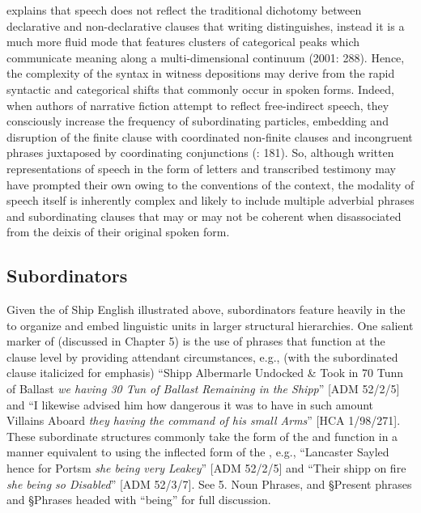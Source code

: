 \citeauthor{Givón2001} explains that speech does not reflect the traditional dichotomy between declarative and non-declarative clauses that writing distinguishes, instead it is a much more fluid mode that features clusters of categorical peaks which communicate meaning along a multi-dimensional continuum (2001: 288). Hence, the complexity of the syntax in witness depositions may derive from the rapid syntactic and categorical shifts that commonly occur in spoken forms. Indeed, when authors of narrative fiction attempt to reflect free-indirect speech, they consciously increase the frequency of subordinating particles, embedding and disruption of the finite clause with coordinated non-finite clauses and incongruent phrases juxtaposed by coordinating conjunctions (\citealt{Sotirova2016}: 181). So, although written representations of speech in the form of letters and transcribed testimony may have prompted their own  owing to the conventions of the context, the modality of speech itself is inherently complex and likely to include multiple adverbial phrases and subordinating clauses that may or may not be coherent when disassociated from the deixis of their original spoken form.   

\subsection{{Subordinators}}%

Given the  of Ship English illustrated above, subordinators feature heavily in the  to organize and embed linguistic units in larger structural hierarchies. One salient marker of  (discussed in Chapter 5) is the use of  phrases that function at the clause level by providing attendant circumstances, e.g., (with the subordinated clause italicized for emphasis) “Shipp Albermarle Undocked \& Took in 70 Tunn of Ballast \textit{we having 30 Tun of Ballast Remaining in the Shipp}” [ADM 52/2/5] and “I likewise advised him how dangerous it was to have in such amount Villains Aboard \textit{they having the command of his small Arms}” [HCA 1/98/271]. These subordinate structures commonly take the  form of the  and function in a manner equivalent to using the inflected form of the , e.g., “Lancaster Sayled hence for Portsm \textit{she being very Leakey}” [ADM 52/2/5] and “Their shipp on fire \textit{she being so Disabled}” [ADM 52/3/7]. See 5. Noun Phrases, and §Present  phrases and §Phrases headed with “being” for full discussion.

